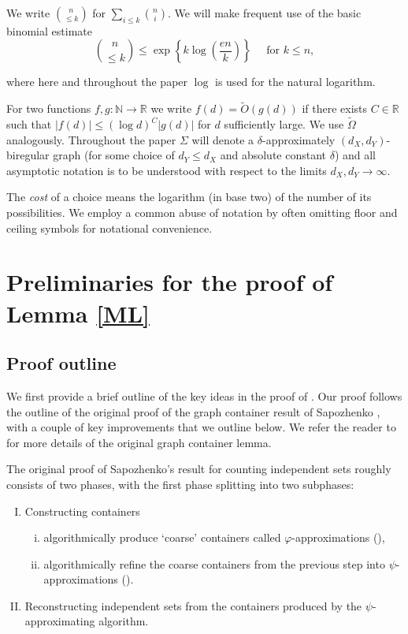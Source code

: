 \documentclass[10pt,a4paper]{amsart}
\theoremstyle{definition}
\newcommand{\beq}[1]{\begin{equation}\label{#1}}
\newcommand{\enq}[0]{\end{equation}}
\newcommand{\gd}[0]{\delta }
\newcommand{\nin}[0]{\noindent}
\newcommand{\0}[0]{\emptyset}
\begin{document}
We write $\binom{n}{\leq k}$ for $\sum_{i \le k}\binom{n}{i}.$ We will make frequent use of the basic binomial estimate 
\beq{binom} {n \choose \le k} \le \exp\left\{k \log \left(\frac{en}{k}\right)\right\} \quad \text{ for } k \le n, \enq

\nin where here and throughout the paper $\log$ is used for the natural logarithm.

For two functions $f,g:\mathbb{N}\to \mathbb{R}$ we write $f(d)= \tilde O(g(d))$ if there exists $C\in \mathbb{R}$ such that $|f(d)|\leq (\log d)^C |g(d)|$ for $d$ sufficiently large. We use $\tilde \Omega$ analogously. Throughout the paper $\Sigma$ will denote a $\gd$-approximately $(d_X, d_Y)$-biregular graph (for some choice of  $d_Y\leq d_X$ and absolute constant $\delta$) and all asymptotic notation is to be understood with respect to the limits $d_X,d_Y\to\infty$. 
 
The \emph{cost} of a choice means the logarithm (in base two) of the number of its possibilities.  We employ a common abuse of notation by often omitting floor and ceiling symbols for notational convenience.
\newline

\section{Preliminaries for the proof of Lemma \ref{ML}}\label{prelims}

\subsection{Proof outline}\label{sec.sketch} We first provide a brief outline of the key ideas in the proof of . Our proof follows the outline of the original proof of the graph container result of Sapozhenko \cite{sapocontainer}, with a couple of key improvements that we outline below. We refer the reader to \cite{Galvin_independent} for more details of the original graph container lemma.

 The original proof of Sapozhenko's result for counting independent sets roughly consists of two phases, with the first phase splitting into two subphases:
\begin{enumerate}[I.]
\item Constructing containers
\begin{enumerate}[(i)]
    \item algorithmically produce `coarse' containers called $\varphi$-approximations (),
    \item algorithmically refine the coarse containers from the previous step into $\psi$-approximations ().
\end{enumerate}
\item Reconstructing independent sets from the containers produced by the $\psi$-approximating algorithm.
\end{enumerate}
\end{document}
